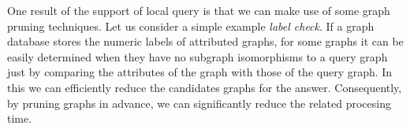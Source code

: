 One result of the support of local query is that we can make use of some graph pruning techniques. Let us consider a simple example \textit{label check}. If a graph database stores the numeric labels of attributed graphs, for some graphs it can be easily determined when they have no subgraph isomorphisms to a query graph just by comparing the attributes of the graph with those of the query graph.
In this we can efficiently reduce the candidates graphs for the answer.
Consequently, by pruning graphs in advance, we can significantly reduce the related procesing time.

